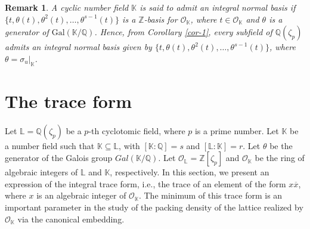 \documentclass{amsart}
\newtheorem{remark}[theorem]{Remark}
\begin{document}
\begin{remark} \label{rem-0} A cyclic number field $\mathbb{K}$ is said to admit an integral normal basis if $\{t,\theta(t),\theta^2(t),\ldots,\theta^{s-1}(t)\}$ is a $\mathbb{Z}$-basis for $\mathcal{O}_{\mathbb{K}}$, where $t\in \mathcal{O}_\mathbb{K}$ and $\theta$ is a generator of $\textrm{Gal}(\mathbb{K}/\mathbb{Q})$. Hence, from Corollary \ref{cor-1}, every subfield of $\mathbb{Q}(\zeta_p)$ admits an integral normal basis given by $\{t,\theta(t),\theta^2(t),\ldots,\theta^{s-1}(t)\}$, where $\theta=\sigma_{u}|_\mathbb{K}$. \end{remark}

\section{The trace form} \label{sec-3}

Let $\mathbb{L}=\mathbb{Q}(\zeta_p)$ be a $p$-th cyclotomic field, where $p$ is a prime number. Let $\mathbb{K}$ be a number field such that $\mathbb{K}\subseteq\mathbb{L}$, with $[\mathbb{K}:\mathbb{Q}]=s$ and $[\mathbb{L}:\mathbb{K}]=r$. Let $\theta$ be the generator of the Galois group $Gal(\mathbb{K}/\mathbb{Q})$. Let $\mathcal{O}_{\mathbb{L}}=\mathbb{Z}[\zeta_p]$ and $\mathcal{O}_{\mathbb{K}}$ be the ring of algebraic integers of $\mathbb{L}$ and $\mathbb{K}$, respectively.
In this section, we present an expression of the integral trace form, i.e., the trace of an element of the form $x\overline{x}$, where $x$ is an algebraic integer of $\mathcal{O}_{\mathbb{K}}$. The minimum of this trace form is an important parameter in the study of the packing density of the lattice realized by $\mathcal{O}_\mathbb{K}$ via the canonical embedding.
\end{document}

